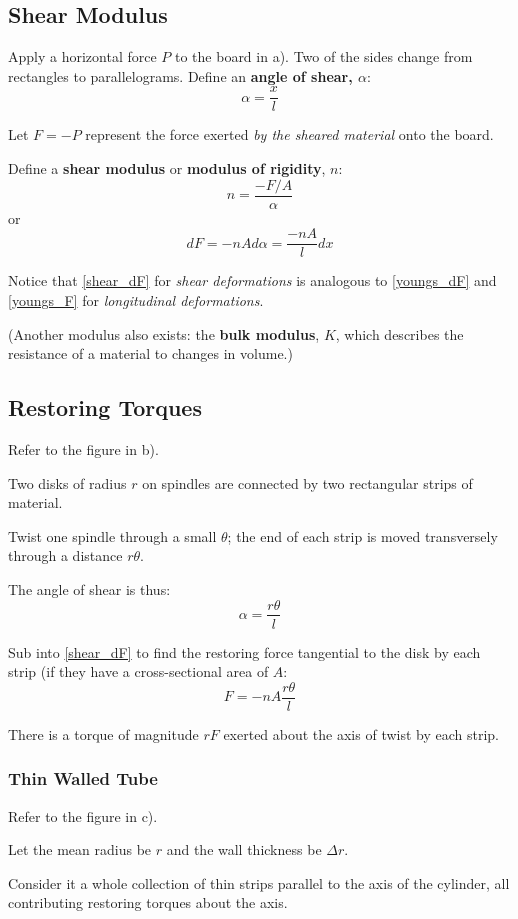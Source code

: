 \documentclass[11pt,letterpaper,titlepage,oneside]{book}
\begin{document}
\subsection{Shear Modulus}
Apply a horizontal force $P$ to the board in a). Two of the sides change from rectangles to parallelograms. Define an \textbf{angle of shear, $\alpha$}:
\[ \alpha = \frac{x}{l} \]

Let $F=-P$ represent the force exerted \textit{by the sheared material} onto the board.

Define a \textbf{shear modulus} or \textbf{modulus of rigidity}, $n$:
\[ n = \frac{-F/A}{\alpha} \]
or
\begin{equation} \boxed{dF = -nA d\alpha = \frac{-nA}{l}dx} \label{shear_dF} \end{equation}

Notice that \eqref{shear_dF} for \textit{shear deformations} is analogous to \eqref{youngs_dF} and \eqref{youngs_F} for \textit{longitudinal deformations}.

(Another modulus also exists: the \textbf{bulk modulus}, $K$, which describes the resistance of a material to changes in volume.)

\subsection{Restoring Torques}
Refer to the figure in b).

Two disks of radius $r$ on spindles are connected by two rectangular strips of material.

Twist one spindle through a small $\theta$; the end of each strip is moved transversely through a distance $r\theta$.

The angle of shear is thus: \[ \alpha = \frac{r\theta}{l} \]

Sub into \eqref{shear_dF} to find the restoring force tangential to the disk by each strip (if they have a cross-sectional area of $A$:
\[ F = -nA\frac{r\theta}{l} \]

There is a torque of magnitude $rF$ exerted about the axis of twist by each strip.

\subsubsection{Thin Walled Tube}
Refer to the figure in c).

Let the mean radius be $r$ and the wall thickness be $\Delta r$.

Consider it a whole collection of thin strips parallel to the axis of the cylinder, all contributing restoring torques about the axis.
\end{document}

